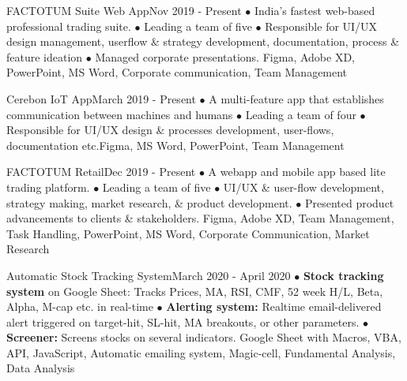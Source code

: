 \vspace{1ex}
\begin{projects}
  \project
    {FACTOTUM Suite Web App}{Nov 2019 - Present}
    { }
    {$\bullet$ India's fastest web-based professional trading suite. $\bullet$ Leading a team of five $\bullet$ Responsible for UI/UX design management, userflow \& strategy development, documentation, process \& feature ideation $\bullet$ Managed corporate presentations.}
    {Figma, Adobe XD, PowerPoint, MS Word, Corporate communication, Team Management}
\end{projects}
\vspace{-6ex}
\begin{projects}
    \project
    {Cerebon IoT App}{March 2019 - Present}
    {}
    {$\bullet$ A multi-feature app that establishes communication between machines and humans $\bullet$ Leading a team of four $\bullet$ Responsible for UI/UX design \& processes development, user-flows, documentation etc.}{Figma, MS Word, PowerPoint, Team Management}
\end{projects}
\vspace{-4ex}
\begin{projects} 
  \project
    {FACTOTUM Retail}{Dec 2019 - Present}
    { }
    {$\bullet$ A webapp and mobile app based lite trading platform. $\bullet$ Leading a team of five $\bullet$ UI/UX \& user-flow development, strategy making, market research, \& product development. $\bullet$ Presented product advancements to clients \& stakeholders.}
    {Figma, Adobe XD, Team Management, Task Handling, PowerPoint, MS Word, Corporate Communication, Market Research}
\end{projects}
\vspace{-4ex}
\begin{projects}    
    \project
    {Automatic Stock Tracking System}{March 2020 - April 2020}
    {}
    {$\bullet$ \textbf{Stock tracking system} on Google Sheet: Tracks Prices, MA, RSI, CMF, 52 week H/L, Beta, Alpha, M-cap etc. in real-time $\bullet$ \textbf{Alerting system:} Realtime email-delivered alert triggered on target-hit, SL-hit, MA breakouts, or other parameters. $\bullet$ \textbf{Screener:} Screens stocks on several indicators.}
    {Google Sheet with Macros, VBA, API, JavaScript, Automatic emailing system, Magic-cell, Fundamental Analysis, Data Analysis}
\end{projects}
